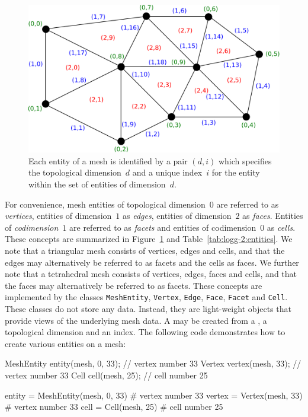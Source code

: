 \begin{figure}
  \centering
  \includegraphics[width=\largefig]{chapters/logg-2/pdf/mesh-p1-entities.pdf}
  \caption{Each entity of a mesh is identified by a pair $(d, i)$
    which specifies the topological dimension~$d$ and a unique
    index~$i$ for the entity within the set of entities of
    dimension~$d$.}
  \label{fig:logg-2:entities}
\end{figure}


For convenience, mesh entities of topological dimension~$0$ are
referred to as \emph{vertices}, entities of dimension~$1$ as
\emph{edges}, entities of dimension~$2$ as \emph{faces}. Entities of
\emph{codimension}~$1$ are referred to as \emph{facets} and entities
of codimension~$0$ as \emph{cells}. These concepts are summarized in
Figure~\ref{fig:logg-2:entities} and
Table~\ref{tab:logg-2:entities}. We note that a triangular mesh
consists of vertices, edges and cells, and that the edges may
alternatively be referred to as facets and the cells as faces. We
further note that a tetrahedral mesh consists of vertices, edges,
faces and cells, and that the faces may alternatively be referred to
as facets. These concepts are implemented by the classes
\texttt{MeshEntity}, \texttt{Vertex}, \texttt{Edge}, \texttt{Face},
\texttt{Facet} and \texttt{Cell}. These classes do not store any
data. Instead, they are light-weight objects that provide views of the
underlying mesh data. A  may be created from a
, a topological dimension and an index. The following code
demonstrates how to create various entities on a mesh:
\begin{c++}
MeshEntity entity(mesh, 0, 33); // vertex number 33
Vertex vertex(mesh, 33);        // vertex number 33
Cell cell(mesh, 25);            // cell number 25
\end{c++}
\begin{python}
entity = MeshEntity(mesh, 0, 33) # vertex number 33
vertex = Vertex(mesh, 33)        # vertex number 33
cell = Cell(mesh, 25)            # cell number 25
\end{python}

